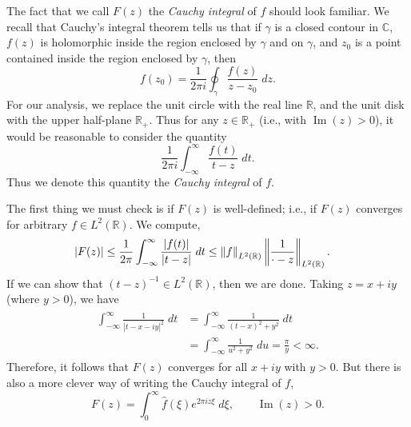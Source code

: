 \documentclass{article}
\begin{document}
\begin{remark}
	The fact that we call $F(z)$ the \textit{Cauchy integral} of $f$ should look familiar. We recall that Cauchy's integral theorem tells us that if $\gamma$ is a closed contour in $\mathbb{C}$, $f(z)$ is holomorphic inside the region enclosed by $\gamma$ and on $\gamma$, and $z_{0}$ is a point contained inside the region enclosed by $\gamma$, then 
	\begin{equation*}
		f(z_{0}) = \frac{1}{2\pi i}\oint_{\gamma}\frac{f(z)}{z - z_{0}}\;dz. 
	\end{equation*}
	For our analysis, we replace the unit circle with the real line $\mathbb{R}$, and the unit disk with the upper half-plane $\mathbb{R}_{+}$. Thus for any $z \in \mathbb{R}_{+}$ (i.e., with $\operatorname{Im}(z) > 0$), it would be reasonable to consider the quantity 
	\begin{equation*}
		\frac{1}{2\pi i}\int_{-\infty}^{\infty}\frac{f(t)}{t - z}\;dt. 
	\end{equation*} 
	Thus we denote this quantity the \textit{Cauchy integral} of $f$. 
\end{remark} 
The first thing we must check is if $F(z)$ is well-defined; i.e., if $F(z)$ converges for arbitrary $f \in L^{2}(\mathbb{R})$. We compute, 
\begin{align*}
	\begin{split}
		|F(z)| &\leq \frac{1}{2\pi}\int_{-\infty}^{\infty}\frac{|f(t)|}{|t - z|}\;dt \leq \left\Vert f \right\Vert_{L^{2}(\mathbb{R})}\left\Vert \frac{1}{\cdot - z} \right\Vert_{L^{2}(\mathbb{R})}. 
	\end{split} 
\end{align*} 
If we can show that $(t - z)^{-1} \in L^{2}(\mathbb{R})$, then we are done. Taking $z = x + iy$ (where $y > 0$), we have 
\begin{align*}
	\begin{split}
		\int_{-\infty}^{\infty}\frac{1}{|t - x -iy|^{2}}\;dt &= \int_{-\infty}^{\infty}\frac{1}{(t - x)^{2} + y^{2}}\;dt \\
		&= \int_{-\infty}^{\infty}\frac{1}{u^{2} + y^{2}}\;du = \frac{\pi}{y} < \infty. 
	\end{split} 
\end{align*} 
Therefore, it follows that $F(z)$ converges for all $x + iy$ with $y > 0$. But there is also a more clever way of writing the Cauchy integral of $f$, 
\begin{equation*}
	F(z) = \int_{0}^{\infty}\hat{f}(\xi)e^{2\pi i z\xi}\;d\xi, \qquad \operatorname{Im}(z) > 0. 
\end{equation*} 
\end{document}
